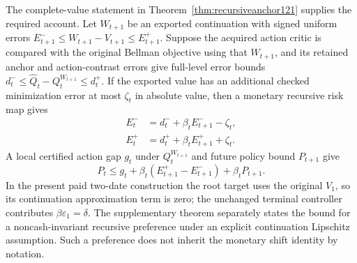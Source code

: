 The complete-value statement in
Theorem~\ref{thm:recursiveanchor121} supplies the required
account.  Let \(W_{t+1}\) be an exported continuation
with signed uniform errors
\(E_{t+1}^-\leq W_{t+1}-V_{t+1}\leq E_{t+1}^+\).
Suppose the acquired action critic is compared with
the original Bellman objective using that \(W_{t+1}\),
and its retained anchor and action-contrast errors
give full-level error bounds
\(d_t^-\leq\widehat Q_t-Q_t^{W_{t+1}}\leq d_t^+\).
If the exported value has an additional checked
minimization error at most \(\zeta_t\) in absolute
value, then a monetary recursive risk map gives
\begin{align}
 E_t^-&=d_t^-+\beta_tE_{t+1}^- -\zeta_t,\nonumber\\
 E_t^+&=d_t^++\beta_tE_{t+1}^+ +\zeta_t.
 \label{eq:anchorrecursion121}
\end{align}
A local certified action gap \(g_t\) under
\(Q_t^{W_{t+1}}\) and future policy bound \(P_{t+1}\)
give
\[
 P_t\leq g_t+\beta_t(E_{t+1}^+-E_{t+1}^-)
                         +\beta_tP_{t+1}.
\]
In the present paid two-date construction the root
target uses the original \(V_1\), so its continuation
approximation term is zero; the unchanged terminal
controller contributes \(\beta\varepsilon_1=\delta\).
The supplementary theorem separately states the
bound for a noncash-invariant recursive preference
under an explicit continuation Lipschitz assumption.
Such a preference does not inherit the monetary
shift identity by notation.
